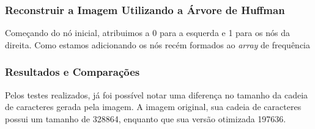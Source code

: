 \subsubsection{Reconstruir a Imagem Utilizando a Árvore de Huffman}
\label{sss.huffmantreebacktrack}

Começando do nó inicial, atribuimos a 0 para a esquerda e 1 para os nós da direita. Como estamos adicionando os nós recém formados ao {\em array} de frequência

\subsubsection{Resultados e Comparações}
\label{sss.results}
%
Pelos testes realizados, já foi possível notar uma diferença no tamanho da cadeia de caracteres gerada pela imagem. A imagem original, sua cadeia de caracteres possui um tamanho de 328864, enquanto que sua versão otimizada 197636.
%
%
